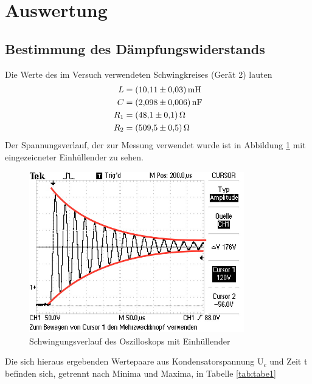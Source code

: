 
\section{Auswertung}
\subsection{Bestimmung des Dämpfungswiderstands}
Die Werte des im Versuch verwendeten Schwingkreises (Gerät 2) lauten
\begin{align*}
  L &= \SI{10.11(3)}{\milli\henry} \\
  C &= \SI{2.098(6)}{\nano\farad} \\
  R_1 &= \SI{48.1 (1)}{\ohm} \\
  R_2 &= \SI{509.5(5)}{\ohm} \\
\end{align*}
\noindent Der Spannungsverlauf, der zur Messung verwendet wurde ist in Abbildung \ref{fig:fig1}
mit eingezeicneter Einhüllender zu sehen.
\begin{figure}[H]
  \centering
  \includegraphics[height=7cm]{Schwingung.JPG}
  \caption{Schwingungsverlauf des Oszilloskops mit Einhüllender}
  \label{fig:fig1}
\end{figure}

\noindent Die sich hieraus ergebenden Wertepaare aus Kondensatorspannung $\text{U}_c$
und Zeit t befinden sich, getrennt nach Minima und Maxima, in Tabelle \ref{tab:tabe1}



